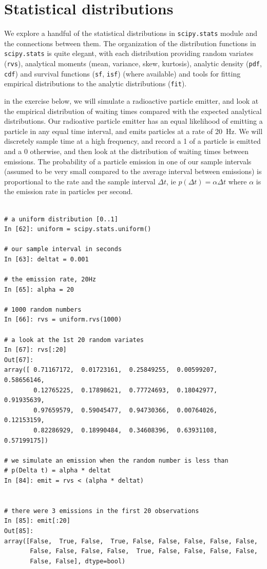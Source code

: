 \section{Statistical distributions}
\label{sec:stats_distributions}

We explore a handful of the statistical distributions in
\texttt{scipy.stats} module and the connections between them.  The
organization of the distribution functions in \texttt{scipy.stats} is
quite elegant, with each distribution providing random variates
(\texttt{rvs}), analytical moments (mean, variance, skew, kurtosis),
analytic density (\texttt{pdf}, \texttt{cdf}) and survival functions
(\texttt{sf}, \texttt{isf}) (where available) and tools for fitting
empirical distributions to the analytic distributions (\texttt{fit}).

in the exercise below, we will simulate a radioactive particle
emitter, and look at the empirical distribution of waiting times
compared with the expected analytical distributions.  Our radioative
particle emitter has an equal likelihood of emitting a particle in any
equal time interval, and emits particles at a rate of 20~Hz.  We will
discretely sample time at a high frequency, and record a 1 of a
particle is emitted and a 0 otherwise, and then look at the
distribution of waiting times between emissions.  The probability of a
particle emission in one of our sample intervals (assumed to be very
small compared to the average interval between emissions) is
proportional to the rate and the sample interval $\Delta t$, ie
$p(\Delta t) = \alpha \Delta t$ where $\alpha$ is the emission rate in
particles per second.

\begin{lstlisting}

# a uniform distribution [0..1]
In [62]: uniform = scipy.stats.uniform()

# our sample interval in seconds
In [63]: deltat = 0.001

# the emission rate, 20Hz
In [65]: alpha = 20

# 1000 random numbers
In [66]: rvs = uniform.rvs(1000)

# a look at the 1st 20 random variates
In [67]: rvs[:20]
Out[67]: 
array([ 0.71167172,  0.01723161,  0.25849255,  0.00599207,  0.58656146,
        0.12765225,  0.17898621,  0.77724693,  0.18042977,  0.91935639,
        0.97659579,  0.59045477,  0.94730366,  0.00764026,  0.12153159,
        0.82286929,  0.18990484,  0.34608396,  0.63931108,  0.57199175])

# we simulate an emission when the random number is less than
# p(Delta t) = alpha * deltat
In [84]: emit = rvs < (alpha * deltat)


# there were 3 emissions in the first 20 observations
In [85]: emit[:20]
Out[85]: 
array([False,  True, False,  True, False, False, False, False, False,
       False, False, False, False,  True, False, False, False, False,
       False, False], dtype=bool)
\end{lstlisting}

